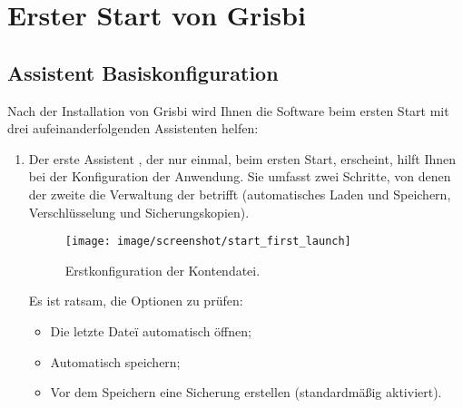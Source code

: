
\chapter{Erster Start von Grisbi\label{start}}


\section{Assistent Basiskonfiguration\label{start-first}}

Nach der Installation von Grisbi wird Ihnen die Software beim ersten Start mit drei aufeinanderfolgenden Assistenten helfen:

\begin{enumerate}
	\item Der erste Assistent , der nur einmal, beim ersten Start, erscheint, hilft Ihnen bei der Konfiguration der Anwendung. Sie umfasst zwei Schritte, von denen der zweite die Verwaltung der  betrifft (automatisches Laden und Speichern, Verschlüsselung und Sicherungskopien).%
	
\begin{figure}[htbp]
	\begin{center}
		\texttt{[image: image/screenshot/start\_first\_launch]}
	\end{center}
	\caption{Erstkonfiguration der Kontendatei.}
	\label{start_first_launch}
\end{figure}	
	
Es ist ratsam, die Optionen zu prüfen:%
	\begin{itemize}
		\item Die letzte Dateï automatisch öffnen;%
		\item Automatisch speichern;%
		\item Vor dem Speichern eine Sicherung erstellen (standardmäßig aktiviert).%
	\end{itemize}
\end{enumerate}

